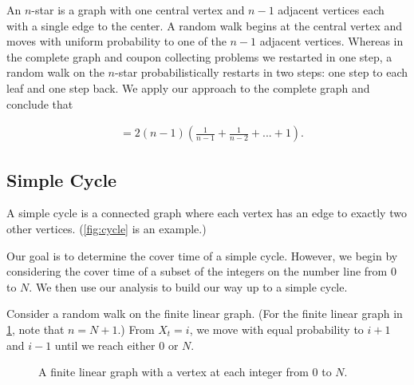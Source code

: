 \documentclass[12pt]{article}
\theoremstyle{definition}
\DeclareMathOperator{\cov}{t_\textrm{cov}}  %
\begin{document}
An $n$-star is a graph with one central vertex and $n-1$ adjacent vertices each with a single
edge to the center.
A random walk begins at the central vertex and moves with uniform probability to
one of the $n-1$ adjacent vertices.
Whereas in the complete graph and coupon collecting problems we 
restarted in one step, a random walk on the $n$-star probabilistically restarts
in two steps: one step to each leaf and one step back.
We apply our approach to the complete graph and conclude that

\begin{align}
\cov&= 2(n-1) \left(\frac{1}{n-1}+\frac{1}{n-2}+...+1\right). \nonumber
\end{align}

\subsection{Simple Cycle}

A simple cycle is a connected graph where
each vertex has an edge to exactly two other vertices.
(\cref{fig:cycle} is an example.)

Our goal is to determine the cover time of a simple cycle.
However, we begin by considering the cover time of a subset
of the integers on the number line from $0$ to $N$.
We then use our analysis to build our way up to a simple cycle.

Consider a random walk on the finite linear graph.
(For the finite linear graph in \cref{fig:line}, note that $n=N+1$.)
From $X_t=i$, we move with equal probability to $i+1$
and $i-1$ until we reach either $0$ or $N$.

\begin{figure}[ht]
	\centering
	\caption{A finite linear graph with a vertex at each integer from $0$ to $N$.}\label{fig:line}
\end{figure}
\end{document}

